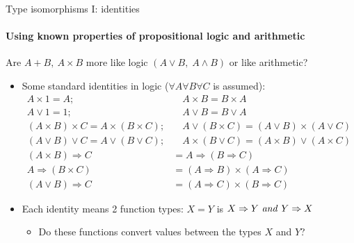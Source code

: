 \documentclass[english]{beamer}
\begin{document}
\begin{frame}{Type isomorphisms I: identities}


\framesubtitle{Using known properties of propositional logic and arithmetic}

Are $A+B,\:A\times B$ more like logic $\left(A\vee B,\;A\wedge B\right)$
or like arithmetic?
\begin{itemize}
\item Some standard identities in logic ($\forall A\forall B\forall C$
is assumed):
\begin{align*}
A\times1=A; & \quad A\times B=B\times A\\
A\vee1=1; & \quad A\vee B=B\vee A\\
(A\times B)\times C=A\times(B\times C); & \quad A\vee(B\times C)=(A\vee B)\times(A\vee C)\\
(A\vee B)\vee C=A\vee(B\vee C); & \quad A\times(B\vee C)=(A\times B)\vee(A\times C)\\
(A\times B)\Rightarrow C & =A\Rightarrow(B\Rightarrow C)\\
A\Rightarrow(B\times C) & =(A\Rightarrow B)\times(A\Rightarrow C)\\
(A\vee B)\Rightarrow C & =(A\Rightarrow C)\times(B\Rightarrow C)
\end{align*}
\item Each identity means 2 function types: $X=Y$ is $X\Rightarrow Y\text{ \emph{and} }Y\Rightarrow X$ 
\begin{itemize}
\item Do these functions convert values between the types $X$ and $Y$?
\end{itemize}
\end{itemize}
\end{frame}
\end{document}
